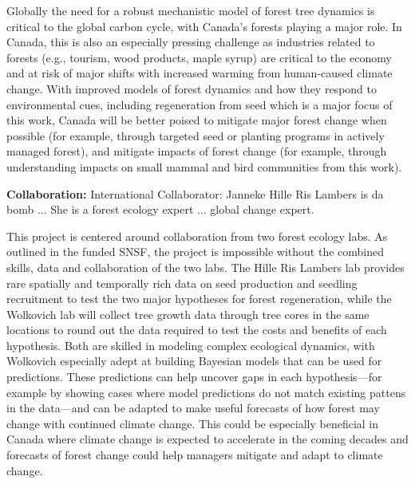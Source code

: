 \documentclass[11pt]{article}
\begin{document}
Globally the need for a robust mechanistic model of forest tree dynamics is critical to the global carbon cycle, with Canada's forests playing a major role. In Canada, this is also an especially pressing challenge as industries related to forests (e.g., tourism, wood products, maple syrup) are critical to the economy and at risk of major shifts with increased warming from human-caused climate change. With improved models of forest dynamics and how they respond to environmental cues, including regeneration from seed which is a major focus of this work, Canada will be better poised to mitigate major forest change when possible (for example, through targeted seed or planting programs in actively managed forest), and mitigate impacts of forest change (for example, through understanding impacts on small mammal and bird communities from this work). 


{\bf Collaboration:} %
International Collaborator: Janneke Hille Ris Lambers is da bomb ... She is a forest ecology expert ... global change expert.

This project is centered around collaboration from two forest ecology labs. As outlined in the funded SNSF, the project is impossible without the combined skills, data and collaboration of the two labs. The Hille Ris Lambers lab provides rare spatially and temporally rich data on seed production and seedling recruitment to test the two major hypotheses for forest regeneration, while the Wolkovich lab will collect tree growth data through tree cores in the same locations to round out the data required to test the costs and benefits of each hypothesis. Both are skilled in modeling complex ecological dynamics, with Wolkovich especially adept at building Bayesian models that can be used for predictions. These predictions can help uncover gaps in each hypothesis---for example by showing cases where model predictions do not match existing pattens in the data---and can be adapted to make useful forecasts of how forest may change with continued climate change. This could be especially beneficial in Canada where climate change is expected to accelerate in the coming decades and forecasts of forest change could help managers mitigate and adapt to climate change. 
\end{document}
